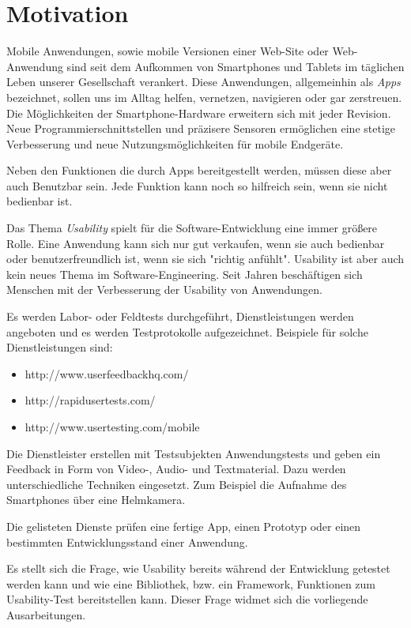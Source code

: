 \section{Motivation}

Mobile Anwendungen, sowie mobile Versionen einer Web-Site oder Web-Anwendung sind seit dem Aufkommen von Smartphones und Tablets im täglichen Leben unserer Gesellschaft verankert. Diese Anwendungen, allgemeinhin als \textit{Apps} bezeichnet, sollen uns im Alltag helfen, vernetzen, navigieren oder gar zerstreuen. Die Möglichkeiten der Smartphone-Hardware erweitern sich mit jeder Revision. Neue Programmierschnittstellen und präzisere Sensoren ermöglichen eine stetige Verbesserung und neue Nutzungsmöglichkeiten für mobile Endgeräte. 

Neben den Funktionen die durch Apps bereitgestellt werden, müssen diese aber auch Benutzbar sein. Jede Funktion kann noch so hilfreich sein, wenn sie nicht bedienbar ist. 

Das Thema \textit{Usability} spielt für die Software-Entwicklung eine immer größere Rolle. Eine Anwendung kann sich nur gut verkaufen, wenn sie auch bedienbar oder benutzerfreundlich ist, wenn sie sich "richtig anfühlt". Usability ist aber auch kein neues Thema im Software-Engineering. Seit Jahren beschäftigen sich Menschen mit der Verbesserung der Usability von Anwendungen.

Es werden Labor- oder Feldtests durchgeführt, Dienstleistungen werden angeboten und es werden Testprotokolle aufgezeichnet. Beispiele für solche Dienstleistungen sind: 

\begin{itemize}
    \item{http://www.userfeedbackhq.com/}
    \item{http://rapidusertests.com/}
    \item{http://www.usertesting.com/mobile}
\end{itemize}

Die Dienstleister erstellen mit Testsubjekten Anwendungstests und geben ein Feedback in Form von Video-, Audio- und Textmaterial. Dazu werden unterschiedliche Techniken eingesetzt. Zum Beispiel die Aufnahme des Smartphones über eine Helmkamera. 

Die gelisteten Dienste prüfen eine fertige App, einen Prototyp oder einen bestimmten Entwicklungsstand einer Anwendung. %

Es stellt sich die Frage, wie Usability bereits während der Entwicklung getestet werden kann und wie eine Bibliothek, bzw. ein Framework, Funktionen zum Usability-Test bereitstellen kann. Dieser Frage widmet sich die vorliegende Ausarbeitungen. %



